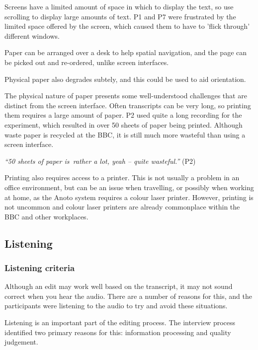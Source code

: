 Screens have a limited amount of space in which to display the text, so use scrolling to display large amounts of text.
P1 and P7 were frustrated by the limited space offered by the screen, which caused them to have to 'flick through'
different windows.

Paper can be arranged over a desk to help spatial navigation, and the page can be picked out and re-ordered, unlike
screen interfaces.

Physical paper also degrades subtely, and this could be used to aid orientation.


The physical nature of paper presents some well-understood challenges that are distinct from the screen interface.
Often transcripts can be very long, so printing them requires a large amount of paper. P2 used quite a long recording
for the experiment, which resulted in over 50 sheets of paper being printed. Although waste paper is recycled at the
BBC, it is still much more wasteful than using a screen interface.

\textit{``50 sheets of paper is rather a lot, yeah -- quite wasteful.''} (P2)


Printing also requires access to a printer. This is not usually a problem in an office environment, but can be an issue
when travelling, or possibly when working at home, as the Anoto system requires a colour laser printer. However,
printing is not uncommon and colour laser printers are already commonplace within the BBC and other workplaces.

\subsection{Listening}

\subsubsection{Listening criteria}

Although an edit may work well based on the transcript, it may not sound correct when you hear the audio. There are a
number of reasons for this, and the participants were listening to the audio to try and avoid these situations.

Listening is an important part of the editing process. The interview process identified two primary reasons for this:
information processing and quality judgement.


